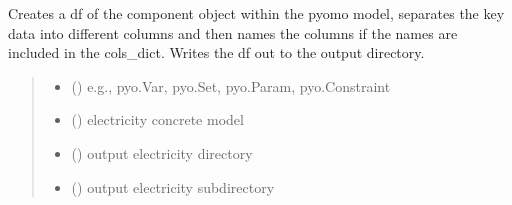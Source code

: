 \documentclass[letterpaper,10pt,english]{sphinxmanual}
\begin{document}
\begin{fulllineitems}
\label{\detokenize{src.models.electricity.scripts.postprocessor:src.models.electricity.scripts.postprocessor.report_obj_df}}
\pysigstartsignatures
\pysiglinewithargsret
{}
{\sphinxparamcomma {}\sphinxparamcomma {}\sphinxparamcomma {}}
{}
\pysigstopsignatures
\sphinxAtStartPar
Creates a df of the component object within the pyomo model, separates the key data into
different columns and then names the columns if the names are included in the cols\_dict.
Writes the df out to the output directory.
\begin{quote}\begin{description}
\begin{itemize}
\item {} 
\sphinxAtStartPar
{} () \textendash{} e.g., pyo.Var, pyo.Set, pyo.Param, pyo.Constraint

\item {} 
\sphinxAtStartPar
{} () \textendash{} electricity concrete model

\item {} 
\sphinxAtStartPar
{} () \textendash{} output electricity directory

\item {} 
\sphinxAtStartPar
{} () \textendash{} output electricity sub\sphinxhyphen{}directory

\end{itemize}

\end{description}\end{quote}

\end{fulllineitems}


\sphinxstepscope
\end{document}
